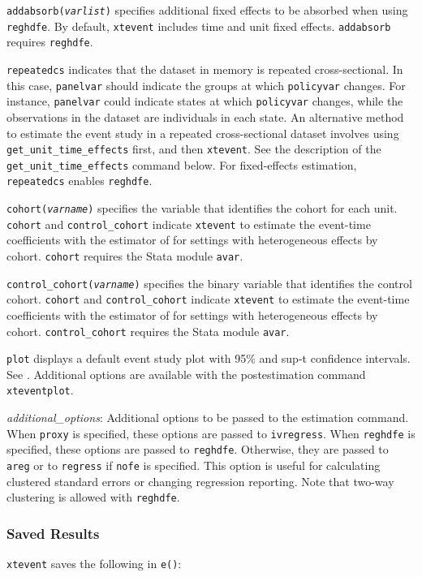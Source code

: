 \documentclass[12pt]{article}
\begin{document}
\hangpara
{\tt addabsorb({\it varlist})} specifies additional fixed effects to be absorbed when using {\tt reghdfe}.
By default, {\tt xtevent} includes time and unit fixed effects.
{\tt addabsorb} requires {\tt reghdfe}.

\hangpara
{\tt repeatedcs} indicates that the dataset in memory is repeated cross-sectional.
In this case, {\tt panelvar} should indicate the groups at which {\tt policyvar} changes.
For instance, {\tt panelvar} could indicate states at which {\tt policyvar} changes, while the observations in the dataset are individuals in each state.
An alternative method to estimate the event study in a repeated cross-sectional dataset involves using {\tt  get\_unit\_time\_effects} first, and then {\tt xtevent}.
See the description of the {\tt get\_unit\_time\_effects} command below.
For fixed-effects estimation, {\tt repeatedcs} enables {\tt reghdfe}.

\hangpara
{\tt cohort({\it varname})} specifies the variable that identifies the cohort for each unit.
{\tt cohort} and {\tt control\_cohort} indicate {\tt xtevent} to estimate the event-time coefficients with the estimator of \citet{sun2021estimating} for settings with heterogeneous effects by cohort.
{\tt cohort} requires the Stata module {\tt avar}.

\hangpara
{\tt control\_cohort({\it varname})} specifies the binary variable that identifies the control cohort. {\tt cohort} and {\tt control\_cohort} indicate {\tt xtevent} to estimate the event-time coefficients with the estimator of \citet{sun2021estimating} for settings with heterogeneous effects by cohort.
{\tt control\_cohort} requires the Stata module {\tt avar}.

\hangpara
{\tt plot} displays a default event study plot with 95\% and sup-t confidence intervals. See \citet{montiel2019simultaneous}.  Additional options are available with the postestimation command {\tt xteventplot}.

\hangpara
{\it additional\_options}: Additional options to be passed to the estimation command.
When {\tt proxy} is specified, these options are passed to {\tt ivregress}.
When {\tt reghdfe} is specified, these options are passed to {\tt reghdfe}.
Otherwise, they are passed to {\tt areg} or to {\tt regress} if {\tt nofe} is specified.
This option is useful for calculating clustered standard errors or changing regression reporting.
Note that two-way clustering is allowed with {\tt reghdfe}.

\subsubsection{Saved Results}
{\tt xtevent} saves the following in {\tt e()}:
\end{document}
